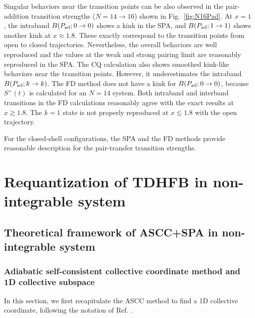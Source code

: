 \documentclass[11pt]{book} %
\begin{document}
Singular behaviors near the transition points can be also observed in
the pair-addition transition strengths ($N=14\rightarrow 16$) shown
in Fig.~\ref{fig:N16Pad}. 
At $x=1$, the intraband $B(P_{\rm ad}; 0\rightarrow 0)$ shows a kink
in the SPA,
and $B(P_{\rm ad}; 1\rightarrow 1)$ shows another kink at $x\approx 1.8$.
These exactly correspond to the transition points from open to closed
trajectories.
Nevertheless, the overall behaviors are well reproduced and
the values at the weak and strong pairing limit are reasonably reproduced
in the SPA.
The CQ calculation also shows smoothed kink-like behaviors near the
transition points.
However, it underestimates the intraband $B(P_{\rm ad}; k\rightarrow k)$.
The FD method does not have a kink for $B(P_{\rm ad}; 0\rightarrow 0)$,
because $S^+(t)$ is calculated for an $N=14$ system.
Both intraband and interband transitions in the FD calculations
reasonably agree with the exact results at $x\gtrsim 1.8$.
The $k=1$ state is not properly reproduced at $x\lesssim 1.8$
with the open trajectory.

For the closed-shell configurations,
the SPA and the FD methods provide reasonable description for the
pair-transfer transition strengths.


\clearpage{\pagestyle{empty}\cleardoublepage}
\chapter{Requantization of TDHFB in non-integrable system}
\label{non-integrable}

\section{Theoretical framework of ASCC+SPA in non-integrable system}
\subsection{Adiabatic self-consistent collective coordinate method and
1D collective subspace}
\label{sec:ASCC}
In this section,
we first recapitulate the ASCC method to find a 1D collective coordinate,
following the notation of Ref. \cite{N2012}.
\end{document}
